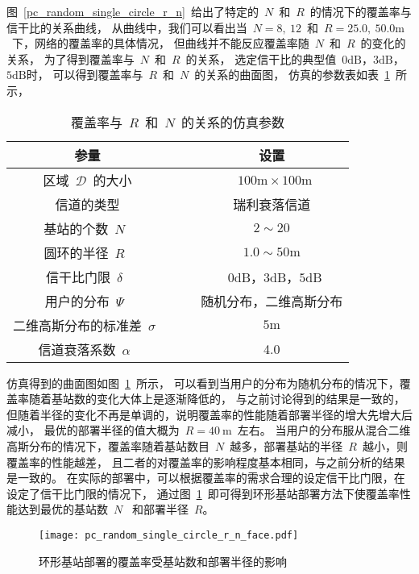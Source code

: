 图~\ref{pc_random_single_circle_r_n}~给出了特定的~$N$~和~$R$~的情况下的覆盖率与信干比的关系曲线，
从曲线中，我们可以看出当~$N=8, ~12$~和~$R=25.0,~50.0\mathrm{m}$~下，网络的覆盖率的具体情况，
但曲线并不能反应覆盖率随~$N$~和~$R$~的变化的关系，
为了得到覆盖率与~$N$~和~$R$~的关系，
选定信干比的典型值~$0\mathrm{dB}$，$3\mathrm{dB}$，$5\mathrm{dB}$时，
可以得到覆盖率与~$R$~和~$N$~的关系的曲面图，
仿真的参数表如表~\ref{pc_random_single_circle_r_n_table}~所示，
\begin{table}[htbp]
\caption{覆盖率与~$R$~和~$N$~的关系的仿真参数}
\label{pc_random_single_circle_r_n_table}
\vspace{0.5em}\centering\wuhao
\begin{tabular}{cccc}
\toprule[1.5pt]
参量 & & & 设置 \\
\midrule[0.5pt]
区域~$\mathcal{D}$~的大小  & & & ~$100\mathrm{m} \times 100 \mathrm{m}$ \\
信道的类型 & & &  瑞利衰落信道\\
基站的个数~$N$~ & & &  $2\sim20$\\
圆环的半径~$R$~ & & &  $1.0\sim 50\mathrm{m}$\\
信干比门限~$\delta$~  & & & ~$0\mathrm{dB}$，$3\mathrm{dB}$，$5\mathrm{dB}$\\
用户的分布~$\Psi$~ & & & 随机分布，二维高斯分布\\
二维高斯分布的标准差~$\sigma$~ & & & ${5\mathrm{m}}$\\
信道衰落系数~$\alpha$~  & & & 4.0\\
\bottomrule[1.5pt]
\end{tabular}
\end{table}
仿真得到的曲面图如图~\ref{pc_random_single_circle_r_n_face}~所示，
可以看到当用户的分布为随机分布的情况下，覆盖率随着基站数的变化大体上是逐渐降低的，
与之前讨论得到的结果是一致的，但随着半径的变化不再是单调的，说明覆盖率的性能随着部署半径的增大先增大后减小，
最优的部署半径的值大概为~$R = 40~\mathrm{m}$~左右。
当用户的分布服从混合二维高斯分布的情况下，覆盖率随着基站数目~$N$~越多，部署基站的半径~$R$~越小，则覆盖率的性能越差，
且二者的对覆盖率的影响程度基本相同，与之前分析的结果是一致的。
在实际的部署中，可以根据覆盖率的需求合理的设定信干比门限，在设定了信干比门限的情况下，
通过图~\ref{pc_random_single_circle_r_n_face}~即可得到环形基站部署方法下使覆盖率性能达到最优的基站数~$N$~
和部署半径~$R$。
\begin{figure}[htbp]
\centering
\texttt{[image: pc\_random\_single\_circle\_r\_n\_face.pdf]}
\caption{环形基站部署的覆盖率受基站数和部署半径的影响}\vspace{-0.5em}
\label{pc_random_single_circle_r_n_face}
\end{figure}

